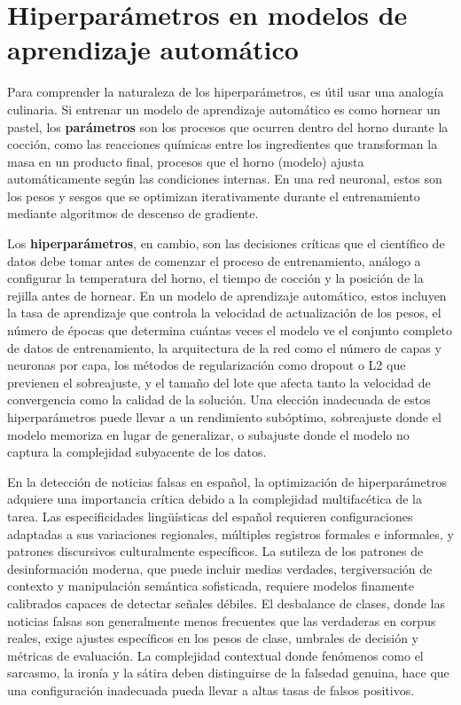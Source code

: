 \section{Hiperparámetros en modelos de aprendizaje automático}
\label{sec:hiperparametros}

Para comprender la naturaleza de los hiperparámetros, es útil usar una analogía culinaria. Si entrenar un modelo de aprendizaje automático es como hornear un pastel, los \textbf{parámetros} son los procesos que ocurren dentro del horno durante la cocción, como las reacciones químicas entre los ingredientes que transforman la masa en un producto final, procesos que el horno (modelo) ajusta automáticamente según las condiciones internas. En una red neuronal, estos son los pesos y sesgos que se optimizan iterativamente durante el entrenamiento mediante algoritmos de descenso de gradiente.

Los \textbf{hiperparámetros}, en cambio, son las decisiones críticas que el científico de datos debe tomar antes de comenzar el proceso de entrenamiento, análogo a configurar la temperatura del horno, el tiempo de cocción y la posición de la rejilla antes de hornear. En un modelo de aprendizaje automático, estos incluyen la tasa de aprendizaje que controla la velocidad de actualización de los pesos, el número de épocas que determina cuántas veces el modelo ve el conjunto completo de datos de entrenamiento, la arquitectura de la red como el número de capas y neuronas por capa, los métodos de regularización como dropout o L2 que previenen el sobreajuste, y el tamaño del lote que afecta tanto la velocidad de convergencia como la calidad de la solución. Una elección inadecuada de estos hiperparámetros puede llevar a un rendimiento subóptimo, sobreajuste donde el modelo memoriza en lugar de generalizar, o subajuste donde el modelo no captura la complejidad subyacente de los datos.

En la detección de noticias falsas en español, la optimización de hiperparámetros adquiere una importancia crítica debido a la complejidad multifacética de la tarea. Las especificidades lingüísticas del español requieren configuraciones adaptadas a sus variaciones regionales, múltiples registros formales e informales, y patrones discursivos culturalmente específicos. La sutileza de los patrones de desinformación moderna, que puede incluir medias verdades, tergiversación de contexto y manipulación semántica sofisticada, requiere modelos finamente calibrados capaces de detectar señales débiles. El desbalance de clases, donde las noticias falsas son generalmente menos frecuentes que las verdaderas en corpus reales, exige ajustes específicos en los pesos de clase, umbrales de decisión y métricas de evaluación. La complejidad contextual donde fenómenos como el sarcasmo, la ironía y la sátira deben distinguirse de la falsedad genuina, hace que una configuración inadecuada pueda llevar a altas tasas de falsos positivos.

